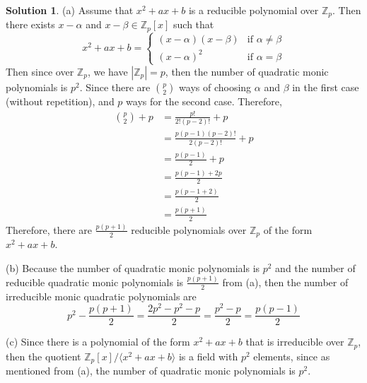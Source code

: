 \documentclass[11pt]{amsart}
\theoremstyle{}\newtheorem{question}{Question}
\theoremstyle{}\newtheorem*{bonus}{Bonus}
\theoremstyle{definition}\newtheorem*{solution}{Solution}
\newcommand{\Z}{\mathbb{Z}}
\begin{document}
\begin{solution}
    (a) Assume that $x^2 + ax + b$ is a reducible polynomial over $\Z_p$. Then there exists $x - \alpha$ and $x - \beta \in \Z_p[x]$ such that
    \begin{equation*}
        x^2 + ax + b = \begin{cases}
            (x - \alpha)(x - \beta) & \text{if $\alpha \neq \beta$} \\
            (x - \alpha)^2 & \text{if $\alpha = \beta$}
        \end{cases}
    \end{equation*}
    Then since over $\Z_p$, we have $|\Z_p| = p$, then the number of quadratic monic polynomials is $p^2$. Since there are ${p \choose 2}$ ways of choosing $\alpha$ and $\beta$ in the first case (without repetition), and $p$ ways for the second case. Therefore,
    \begin{align*}
        {p \choose 2} + p &= \frac{p!}{2!(p - 2)!} + p \\
        &= \frac{p(p - 1)(p - 2)!}{2(p - 2)!} + p \\
        &= \frac{p(p - 1)}{2} + p \\
        &= \frac{p(p - 1) + 2p}{2} \\
        &= \frac{p(p - 1 + 2)}{2} \\
        &= \frac{p(p + 1)}{2}
    \end{align*}
    Therefore, there are $\frac{p(p + 1)}{2}$ reducible polynomials over $\Z_p$ of the form $x^2 + ax + b$.

    (b) Because the number of quadratic monic polynomials is $p^2$ and the number of reducible quadratic monic polynomials is $\frac{p(p + 1)}{2}$ from (a), then the number of irreducible monic quadratic polynomials are
    \begin{equation*}
        p^2 - \frac{p(p + 1)}{2} = \frac{2p^2 - p^2 - p}{2} = \frac{p^2 - p}{2} = \frac{p(p - 1)}{2}
    \end{equation*}

    (c) Since there is a polynomial of the form $x^2 + ax + b$ that is irreducible over $\Z_p$, then the quotient $\Z_p[x]/\langle{x^2 + ax + b}\rangle$ is a field with $p^2$ elements, since as mentioned from (a), the number of quadratic monic polynomials is $p^2$.


\end{solution}
\end{document}
